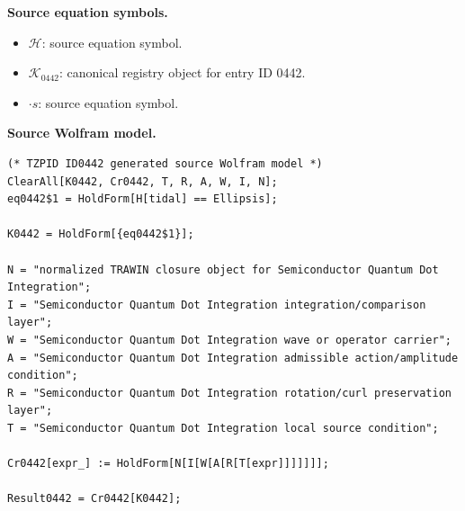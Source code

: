 \begin{minipage}[t]{0.49\linewidth}
\begingroup
\small
\raggedright
\textbf{Source equation symbols.}\par
\begin{itemize}[leftmargin=1.35em,itemsep=1pt,topsep=1pt,parsep=0pt]
    \item $\mathcal{H}$: source equation symbol.
    \item $\mathcal{K}_{0442}$: canonical registry object for entry ID 0442.
    \item $\cdot s$: source equation symbol.
\end{itemize}
\endgroup
\end{minipage}\hfill
\begin{minipage}[t]{0.47\linewidth}
\begingroup
\scriptsize
\raggedright
\textbf{Source Wolfram model.}\par
\begin{Verbatim}[fontsize=\tiny,breaklines=true,breakanywhere=true]
(* TZPID ID0442 generated source Wolfram model *)
ClearAll[K0442, Cr0442, T, R, A, W, I, N];
eq0442$1 = HoldForm[H[tidal] == Ellipsis];

K0442 = HoldForm[{eq0442$1}];

N = "normalized TRAWIN closure object for Semiconductor Quantum Dot Integration";
I = "Semiconductor Quantum Dot Integration integration/comparison layer";
W = "Semiconductor Quantum Dot Integration wave or operator carrier";
A = "Semiconductor Quantum Dot Integration admissible action/amplitude condition";
R = "Semiconductor Quantum Dot Integration rotation/curl preservation layer";
T = "Semiconductor Quantum Dot Integration local source condition";

Cr0442[expr_] := HoldForm[N[I[W[A[R[T[expr]]]]]]];

Result0442 = Cr0442[K0442];
\end{Verbatim}
\endgroup
\end{minipage}

